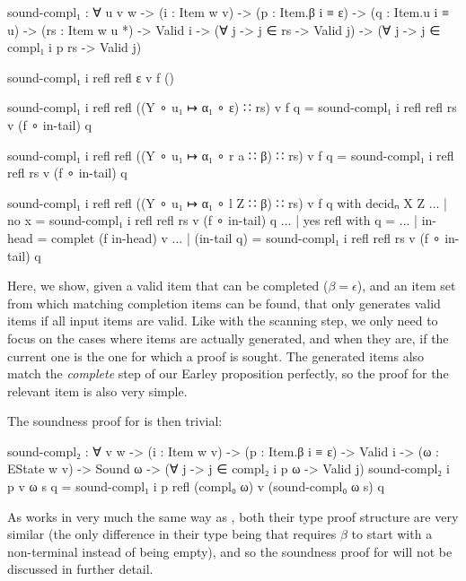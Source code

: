 		\begin{code}
			sound-compl₁ : ∀ {u v w} ->
			  (i : Item w v) ->
			  (p : Item.β i ≡ ε) ->
			  (q : Item.u i ≡ u) ->
			  (rs : Item w u *) ->
			  Valid i -> (∀ {j} -> j ∈ rs -> Valid j) ->
			  (∀ {j} -> j ∈ compl₁ i p rs -> Valid j)

			sound-compl₁ i refl refl ε v f ()

			sound-compl₁ i refl refl ((Y ∘ u₁ ↦ α₁ ∘ ε) ∷ rs) v f q =
			  sound-compl₁ i refl refl rs v (f ∘ in-tail) q

			sound-compl₁ i refl refl ((Y ∘ u₁ ↦ α₁ ∘ r a ∷ β) ∷ rs) v f q =
			  sound-compl₁ i refl refl rs v (f ∘ in-tail) q

			sound-compl₁ i refl refl ((Y ∘ u₁ ↦ α₁ ∘ l Z ∷ β) ∷ rs) v f q with decidₙ X Z
			... | no x = sound-compl₁ i refl refl rs v (f ∘ in-tail) q
			... | yes refl with q =
			...            | in-head     = complet (f in-head) v
			...            | (in-tail q) = sound-compl₁ i refl refl rs v (f ∘ in-tail) q
		\end{code}

		Here, we show, given a valid item that can be completed ($\beta =
		\epsilon$), and an item set from which matching completion items can be
		found, that  only generates valid items if all input
		items are valid. Like with the scanning step, we only need to focus on
		the cases where items are actually generated, and when they are, if the
		current one is the one for which a proof is sought. The generated items
		also match the \emph{complete} step of our Earley proposition
		perfectly, so the proof for the relevant item is also very simple.

		The soundness proof for  is then trivial:

		\begin{code}
			sound-compl₂ : ∀ {v w} ->
			  (i : Item w v) ->
			  (p : Item.β i ≡ ε) ->
			  Valid i -> (ω : EState w v) -> Sound ω ->
			  (∀ {j} -> j ∈ compl₂ i p ω -> Valid j)
			sound-compl₂ i p v ω s q =
			  sound-compl₁ i p refl (compl₀ ω) v (sound-compl₀ ω s) q
		\end{code}

		As  works in very much the same way as
		, both their type proof structure are very similar (the
		only difference in their type being that  requires
		$\beta$ to start with a non-terminal instead of being empty), and so
		the soundness proof for  will not be discussed in
		further detail.


